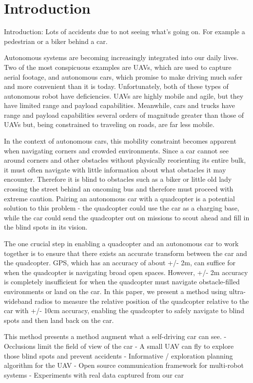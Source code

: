 
\section{Introduction}

Introduction: Lots of accidents due to not seeing what's going on. For example a pedestrian or a biker behind a car.

Autonomous systems are becoming increasingly integrated into
our daily lives. Two of the most conspicuous examples are UAVs,
which are used to capture aerial footage, and autonomous cars,
which promise to make driving much safer and more convenient
than it is today. Unfortunately, both of these types of autonomous
robot have deficiencies. UAVs are highly mobile and agile, but they
have limited range and payload capabilities. Meanwhile, cars and trucks
have range and payload capabilities several orders of magnitude greater than
those of UAVs but, being constrained to traveling on roads, are far less mobile.

In the context of autonomous cars, this mobility constraint becomes apparent
when navigating corners and crowded environments. Since a car cannot
see around corners and other obstacles without physically reorienting its
entire bulk, it must often navigate with little information about what obstacles
it may encounter. Therefore it is blind to obstacles such as a biker or little old
lady crossing the street behind an oncoming bus and therefore must proceed
with extreme caution. Pairing an autonomous car with a quadcopter is a potential
solution to this problem - the quadcopter could use the car as a charging base,
while the car could send the quadcopter out on missions to scout ahead and
fill in the blind spots in its vision.

The one crucial step in enabling a quadcopter and an autonomous car to work
together is to ensure that there exists an accurate transform between the car
and the quadcopter. GPS, which has an accuracy of about +/- 2m, can suffice
for when the quadcopter is navigating broad open spaces. However, +/- 2m
accuracy is completely insufficient for when the quadcopter must navigate
obstacle-filled environments or land on the car. In this paper, we present
a method using ultra-wideband radios to measure the relative position of
the quadcopter relative to the car with +/- 10cm accuracy, enabling the quadcopter
to safely navigate to blind spots and then land back on the car.

This method presents a method augment what a self-driving car can see.
- Occlusions limit the field of view of the car
- A small UAV can fly to explore those blind spots and prevent accidents
- Informative / exploration planning algorithm for the UAV
- Open source communication framework for multi-robot systems
- Experiments with real data captured from our car 

